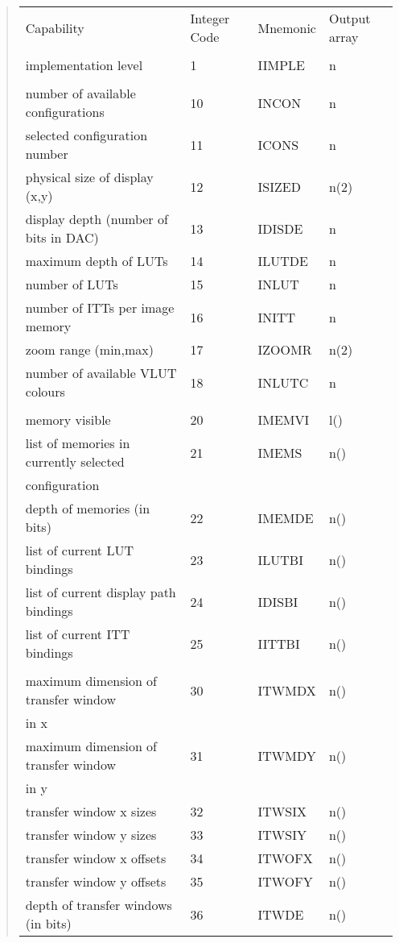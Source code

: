 \begin{quote}
\begin{tabular}{llll}
Capability & Integer Code & Mnemonic & Output array \\
\\
implementation level & 1 & IIMPLE & n \\
\\
number of available configurations & 10 & INCON & n \\
selected configuration number & 11 & ICONS & n \\
physical size of display (x,y) & 12 & ISIZED & n(2) \\
display depth (number of bits in DAC) & 13 & IDISDE & n \\
maximum depth of LUTs & 14 & ILUTDE & n \\
number of LUTs & 15 & INLUT & n \\
number of ITTs per image memory & 16 & INITT & n \\
zoom range (min,max) & 17 & IZOOMR & n(2) \\
number of available VLUT colours & 18 & INLUTC & n \\
\\
memory visible & 20 & IMEMVI & l() \\
list of memories in currently selected & 21 & IMEMS & n() \\
\hfill configuration \\
depth of memories (in bits) & 22 & IMEMDE & n() \\
list of current LUT bindings & 23 & ILUTBI & n() \\
list of current display path bindings & 24 & IDISBI & n() \\
list of current ITT bindings & 25 & IITTBI & n() \\
\\
maximum dimension of transfer window & 30 & ITWMDX & n() \\
\hfill in x \\
maximum dimension of transfer window & 31 & ITWMDY & n() \\
\hfill in y \\
transfer window x sizes & 32 & ITWSIX & n() \\
transfer window y sizes & 33 & ITWSIY & n() \\
transfer window x offsets & 34 & ITWOFX & n() \\
transfer window y offsets & 35 & ITWOFY & n() \\
depth of transfer windows (in bits) & 36 & ITWDE & n() \\
\end{tabular}
\end{quote}

